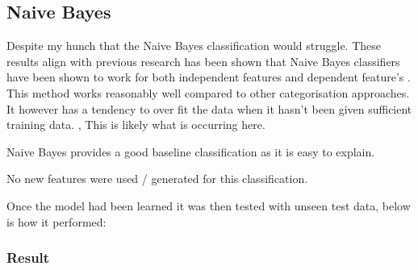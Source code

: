 \documentclass[a4paper]{article}
\begin{document}
\subsection{Naive Bayes}
Despite my hunch that the Naive Bayes classification would struggle. These results align with previous research has been shown that Naive Bayes classifiers have been shown to work for both independent features and dependent feature's \cite{rish2001empirical}.
This method works reasonably well compared to other categorisation approaches. It however has a tendency to over fit the data when it hasn't been given sufficient training data. \cite{Verspoor}, This is likely what is occurring here.

Naive Bayes provides a good baseline classification as it is easy to explain.

No new features were used / generated for this classification.

Once the model had been learned it was then tested with unseen test data, below is how it performed:
\subsubsection{Result}
\end{document}
